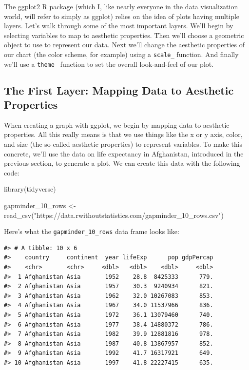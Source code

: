 \documentclass[
]{book}
\newenvironment{Shaded}{\begin{snugshade}}{\end{snugshade}}
\newcommand{\FunctionTok}[1]{\textcolor[rgb]{0.00,0.00,0.00}{#1}}
\newcommand{\NormalTok}[1]{#1}
\newcommand{\OtherTok}[1]{\textcolor[rgb]{0.56,0.35,0.01}{#1}}
\newcommand{\StringTok}[1]{\textcolor[rgb]{0.31,0.60,0.02}{#1}}
\begin{document}
The ggplot2 R package (which I, like nearly everyone in the data visualization world, will refer to simply as ggplot) relies on the idea of plots having multiple layers. Let's walk through some of the most important layers. We'll begin by selecting variables to map to aesthetic properties. Then we'll choose a geometric object to use to represent our data. Next we'll change the aesthetic properties of our chart (the color scheme, for example) using a \texttt{scale\_} function. And finally we'll use a \texttt{theme\_} function to set the overall look-and-feel of our plot.

\hypertarget{the-first-layer-mapping-data-to-aesthetic-properties}{%
\subsection*{The First Layer: Mapping Data to Aesthetic Properties}\label{the-first-layer-mapping-data-to-aesthetic-properties}}

When creating a graph with ggplot, we begin by mapping data to aesthetic properties. All this really means is that we use things like the x or y axis, color, and size (the so-called aesthetic properties) to represent variables. To make this concrete, we'll use the data on life expectancy in Afghanistan, introduced in the previous section, to generate a plot. We can create this data with the following code:

\begin{Shaded}
\begin{Highlighting}[]
\FunctionTok{library}\NormalTok{(tidyverse)}

\NormalTok{gapminder\_10\_rows }\OtherTok{\textless{}{-}} \FunctionTok{read\_csv}\NormalTok{(}\StringTok{"https://data.rwithoutstatistics.com/gapminder\_10\_rows.csv"}\NormalTok{)}
\end{Highlighting}
\end{Shaded}

Here's what the \texttt{gapminder\_10\_rows} data frame looks like:

\begin{verbatim}
#> # A tibble: 10 x 6
#>    country     continent  year lifeExp      pop gdpPercap
#>    <chr>       <chr>     <dbl>   <dbl>    <dbl>     <dbl>
#>  1 Afghanistan Asia       1952    28.8  8425333      779.
#>  2 Afghanistan Asia       1957    30.3  9240934      821.
#>  3 Afghanistan Asia       1962    32.0 10267083      853.
#>  4 Afghanistan Asia       1967    34.0 11537966      836.
#>  5 Afghanistan Asia       1972    36.1 13079460      740.
#>  6 Afghanistan Asia       1977    38.4 14880372      786.
#>  7 Afghanistan Asia       1982    39.9 12881816      978.
#>  8 Afghanistan Asia       1987    40.8 13867957      852.
#>  9 Afghanistan Asia       1992    41.7 16317921      649.
#> 10 Afghanistan Asia       1997    41.8 22227415      635.
\end{verbatim}
\end{document}
